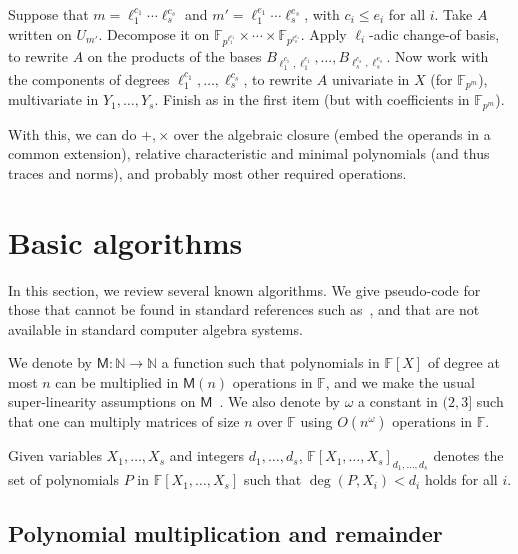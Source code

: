 \documentclass[12pt]{article}
\def\M {\ensuremath{\mathsf{M}}}
\def\N {\ensuremath{\mathbb{N}}}
\def\F {\ensuremath{\mathbb{F}}}
\begin{document}
\begin{itemize}
  Suppose that $m = \ell_1^{c_1} \cdots \ell_s^{c_s}$ and $m' =
  \ell_1^{e_1} \cdots \ell_s^{e_s}$, with $c_i \le e_i$ for all $i$.
  Take $A$ written on $U_{m'}$. Decompose it on $\F_{p^{\ell_1^{e_1}}}
  \times \cdots \times \F_{p^{\ell_s^{e_s}}}$. Apply $\ell_i$-adic
  change-of basis, to rewrite $A$ on the products of the bases
  $B_{\ell_1^{c_1},\ell_1^{e_1}},\dots,B_{\ell_s^{c_s},\ell_s^{e_s}}$.
  Now work with the components of degrees $\ell_1^{c_1},\dots,\ell_s^{c_s}$,
  to rewrite $A$ univariate in $X$ (for $\F_{p^m}$), multivariate 
  in $Y_1,\dots,Y_s$. Finish as in the first item (but with coefficients in
  $\F_{p^m}$).
\end{itemize}

With this, we can do $+,\times$ over the algebraic closure (embed the
operands in a common extension), relative characteristic and minimal
polynomials (and thus traces and norms), and probably most other
required operations.






\section{Basic algorithms}

In this section, we review several known algorithms. We give
pseudo-code for those that cannot be found in standard references such
as~\cite{vzGG}, and that are not available in standard computer
algebra systems.

We denote by $\M:\N \to \N$ a function such that polynomials in
$\F[X]$ of degree at most $n$ can be multiplied in $\M(n)$ operations
in $\F$, and we make the usual super-linearity assumptions on
$\M$~\cite[Chapter~8]{vzGG}. We also denote by $\omega$ a constant in
$(2,3]$ such that one can multiply matrices of size $n$ over $\F$
using $O(n^\omega)$ operations in $\F$.

Given variables $X_1,\dots,X_s$ and integers $d_1,\dots,d_s$,
$\F[X_1,\dots,X_s]_{d_1,\dots,d_s}$ denotes the set of polynomials $P$
in $\F[X_1,\dots,X_s]$ such that $\deg(P,X_i) < d_i$ holds for all
$i$.


\subsection{Polynomial multiplication and remainder}
\end{document}

